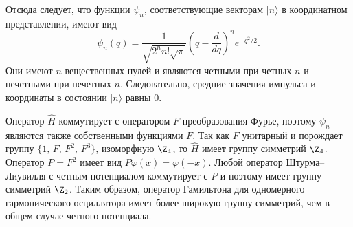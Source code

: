 \documentclass[a4paper
]{article}
\begin{document}
Отсюда следует, что функции $\psi_n$, соответствующие векторам $|n\rangle$
в координатном представлении, имеют вид $$\psi_n(q)=\frac{1}{\sqrt{2^nn!
\sqrt{\pi}}}\left(q-\frac{d}{dq}\right)^ne^{-q^2/2}.$$ Они имеют $n$
вещественных нулей и являются четными при четных $n$ и нечетными при
нечетных $n$. Следовательно, средние значения импульса и координаты
в состоянии $|n\rangle$ равны 0. \par
Оператор $\hat H$ коммутирует с оператором $F$ преобразования Фурье, поэтому
$\psi_n$ являются также собственными функциями $F$. Так как $F$ унитарный и порождает
группу $\{1, \, F, \, F^2, \, F^3\}$, изоморфную $\Z_4$, то $\hat H$ имеет группу симметрий
$\Z_4$. Оператор $P=F^2$ имеет вид $P\varphi(x)=\varphi(-x)$. Любой оператор Штурма--Лиувилля
с четным потенциалом коммутирует с $P$ и поэтому имеет группу симметрий
$\Z_2$. Таким образом, оператор Гамильтона для одномерного гармонического
осциллятора имеет более широкую группу симметрий, чем в общем случае четного потенциала.
\end{document}
